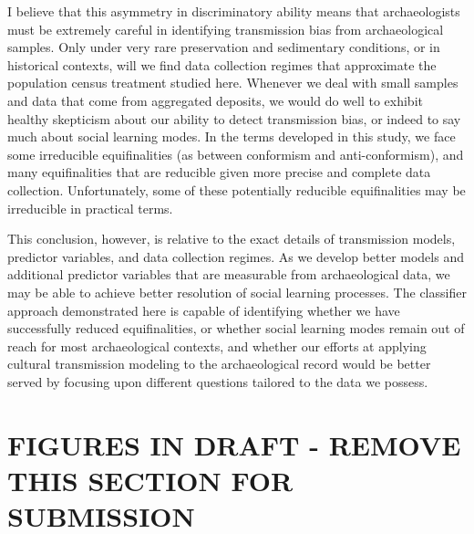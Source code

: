 I believe that this asymmetry in discriminatory ability means that archaeologists must be extremely careful in identifying transmission bias from archaeological samples.  Only under very rare preservation and sedimentary conditions, or in historical contexts, will we find data collection regimes that approximate the population census treatment studied here.  Whenever we deal with small samples and data that come from aggregated deposits, we would do well to exhibit healthy skepticism about our ability to detect transmission bias, or indeed to say much about social learning modes.  In the terms developed in this study, we face some irreducible equifinalities (as between conformism and anti-conformism), and many equifinalities that are reducible given more precise and complete data collection.  Unfortunately, some of these potentially reducible equifinalities may be irreducible in practical terms.  

This conclusion, however, is relative to the exact details of transmission models, predictor variables, and data collection regimes.  As we develop better models and additional predictor variables that are measurable from archaeological data, we may be able to achieve better resolution of social learning processes.  The classifier approach demonstrated here is capable of identifying whether we have successfully reduced equifinalities, or whether social learning modes remain out of reach for most archaeological contexts, and whether our efforts at applying cultural transmission modeling to the archaeological record would be better served by focusing upon different questions tailored to the data we possess.  




\clearpage
\section*{FIGURES IN DRAFT - REMOVE THIS SECTION FOR SUBMISSION}
\setcounter{figure}{0}

